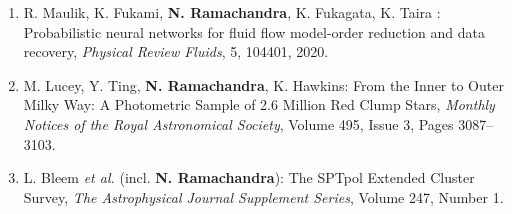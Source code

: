 \documentclass[letterpaper]{article}
\begin{document}
\begin{enumerate}
\item R. Maulik, K. Fukami, \textbf{N. Ramachandra}, K. Fukagata, K. Taira : Probabilistic neural networks for fluid flow model-order reduction and data recovery, {\it Physical Review Fluids}, 5, 104401, 2020.

\item M. Lucey, Y. Ting, \textbf{N. Ramachandra}, K. Hawkins: From the Inner to Outer Milky Way: A Photometric Sample of 2.6 Million Red Clump Stars, {\it Monthly Notices of the Royal Astronomical Society}, Volume 495, Issue 3, Pages 3087–3103.

\item L. Bleem {\it et al.} (incl. \textbf{N. Ramachandra}): The SPTpol Extended Cluster Survey, {\it The Astrophysical Journal Supplement Series}, Volume 247, Number 1.




\end{enumerate}
\end{document}

